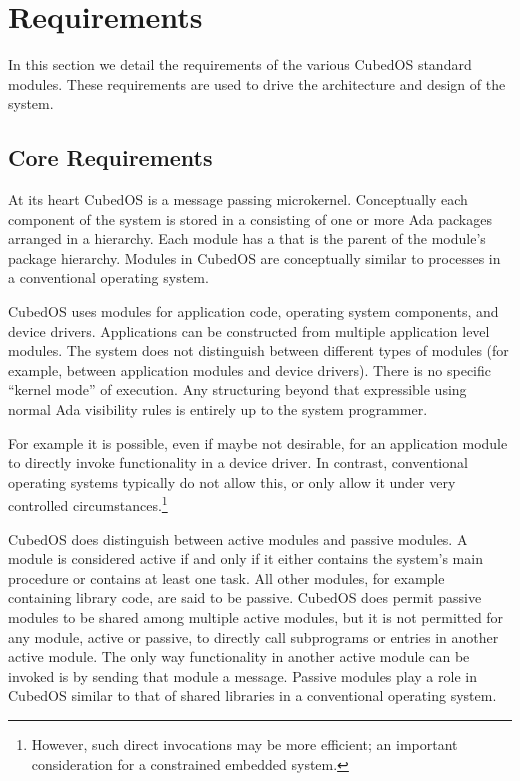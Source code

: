 
\chapter{Requirements}
\label{chapt:requirements}

In this section we detail the requirements of the various CubedOS standard modules. These
requirements are used to drive the architecture and design of the system. 

\section{Core Requirements}
\label{sec:core-requirements}

At its heart CubedOS is a message passing microkernel. Conceptually each component of the system
is stored in a  consisting of one or more Ada packages arranged in a hierarchy.
Each module has a  that is the parent of the module's package
hierarchy. Modules in CubedOS are conceptually similar to processes in a conventional operating
system.

CubedOS uses modules for application code, operating system components, and device drivers.
Applications can be constructed from multiple application level modules. The system does not
distinguish between different types of modules (for example, between application modules and
device drivers). There is no specific ``kernel mode'' of execution. Any structuring beyond that
expressible using normal Ada visibility rules is entirely up to the system programmer.

For example it is possible, even if maybe not desirable, for an application module to directly
invoke functionality in a device driver. In contrast, conventional operating systems typically
do not allow this, or only allow it under very controlled circumstances.\footnote{However, such
  direct invocations may be more efficient; an important consideration for a constrained
  embedded system.}

CubedOS does distinguish between active modules and passive modules. A module is considered
active if and only if it either contains the system's main procedure or contains at least one
task. All other modules, for example containing library code, are said to be passive. CubedOS
does permit passive modules to be shared among multiple active modules, but it is not permitted
for any module, active or passive, to directly call subprograms or entries in another active
module.  The only way functionality in another active module can be invoked is by sending that
module a message. Passive modules play a role in CubedOS similar to that of shared libraries in
a conventional operating system.

